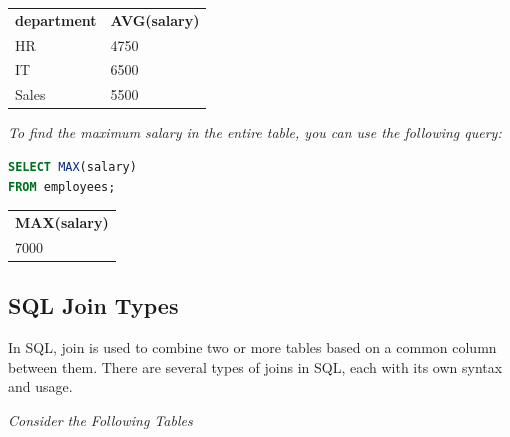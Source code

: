 \documentclass[11pt]{article}
\begin{document}
\begin{table}[H]
	\begin{tabular}{ll}
		\textbf{department} & \textbf{AVG(salary)} \\
		HR                  & 4750                 \\
		IT                  & 6500                 \\
		Sales               & 5500
	\end{tabular}
\end{table}


\textit{To find the maximum salary in the entire table, you can use the following query:}

\begin{lstlisting}[language=sql]
SELECT MAX(salary)
FROM employees;
\end{lstlisting}

\begin{table}[H]
	\begin{tabular}{l}
		\textbf{MAX(salary)} \\
		7000
	\end{tabular}
\end{table}

\subsection{SQL Join Types}

In SQL, join is used to combine two or more tables based on a common column between them. There are several types of joins in SQL, each with its own syntax and usage.

\textit{Consider the Following Tables}
\end{document}

